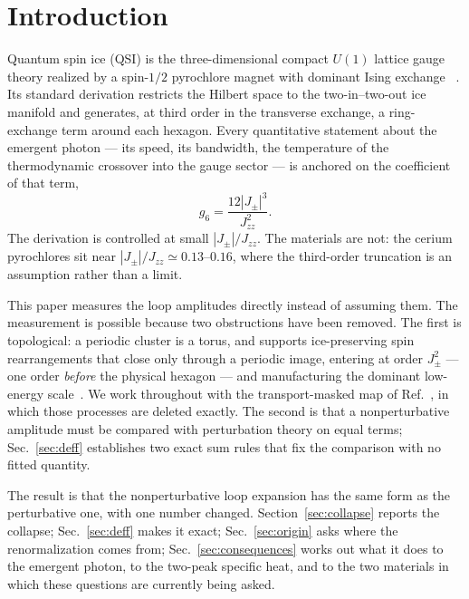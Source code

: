 \documentclass[aps,prb,preprint,amsmath,amssymb,superscriptaddress,
longbibliography,floatfix]{revtex4-2}
\newcommand{\Jzz}{J_{zz}}
\newcommand{\Jpm}{J_{\pm}}
\begin{document}
\maketitle

\section{Introduction}
\label{sec:intro}

Quantum spin ice (QSI) is the three-dimensional compact $U(1)$ lattice gauge
theory realized by a spin-$1/2$ pyrochlore magnet with dominant Ising exchange
~\cite{Hermele2004,Gingras2014,Benton2012,RauGingras2019}.  Its standard
derivation restricts the Hilbert space to the two-in--two-out ice manifold and
generates, at third order in the transverse exchange, a ring-exchange term
around each hexagon.  Every quantitative statement about the emergent photon
--- its speed, its bandwidth, the temperature of the thermodynamic crossover
into the gauge sector --- is anchored on the coefficient of that term,
\begin{equation}
 g_6=\frac{12|\Jpm|^3}{\Jzz^2}.
 \label{eq:g6}
\end{equation}
The derivation is controlled at small $|\Jpm|/\Jzz$.  The materials are not:
the cerium pyrochlores sit near $|\Jpm|/\Jzz\simeq0.13$--$0.16$, where the
third-order truncation is an assumption rather than a limit.

This paper measures the loop amplitudes directly instead of assuming them.  The
measurement is possible because two obstructions have been removed.  The first
is topological: a periodic cluster is a torus, and supports ice-preserving spin
rearrangements that close only through a periodic image, entering at order
$\Jpm^2$ --- one order \emph{before} the physical hexagon --- and manufacturing
the dominant low-energy scale~\cite{ZhouKimMask}.  We work throughout with the
transport-masked map of Ref.~\cite{ZhouKimMask}, in which those processes are
deleted exactly.  The second is that a nonperturbative amplitude must be
compared with perturbation theory on equal terms; Sec.~\ref{sec:deff}
establishes two exact sum rules that fix the comparison with no fitted
quantity.

The result is that the nonperturbative loop expansion has the same form as the
perturbative one, with one number changed.  Section~\ref{sec:collapse} reports
the collapse; Sec.~\ref{sec:deff} makes it exact; Sec.~\ref{sec:origin} asks
where the renormalization comes from; Sec.~\ref{sec:consequences} works out
what it does to the emergent photon, to the two-peak specific heat, and to the
two materials in which these questions are currently being asked.
\end{document}
